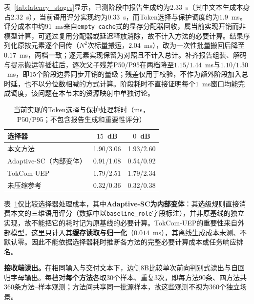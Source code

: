 \documentclass[journal]{IEEEtran}
\begin{document}
表~\ref{tab:latency_stages}显示，已测阶段中报告生成约为$2.33$~s（其中文本生成本身占$2.32$~s），当前语用评分实现约为$0.33$~s，而Token选择与保护调度约为$1.9$~ms。评分成本中约$91$~ms来自\texttt{empty\_cache}式的显存分配器回收，属当前实现开销而非模型计算，可通过复用分配器或延迟释放消除，故不计入方法的必要计算。结果序列化原按元素逐个回传（$N^2$次标量搬运，$2.04$~ms），改为一次性批量搬回后降至$0.17$~ms，两档一致；逐元素实现保留为对照且不计入总计。补齐报告组装、解码与提示搬运等插桩后，逐次父子残差P50/P95在两档降至$1.15/1.44$~ms与$1.10/1.30$~ms，即$15$个阶段边界同步开销的量级；残差仅用于校验，不作为额外阶段加入总时延，也不以分位数相减的方式计算。阶段耗时不直接证明每个$1$~ms窗口均能完成调度，该问题在本节末的资源映射中单独讨论。

\begin{table}[t]
\centering
\caption{当前实现的Token选择与保护处理耗时（ms，P50/P95；不包含报告生成和重要性评分）}
\label{tab:latency_selection}
\renewcommand{\arraystretch}{1.05}
\begin{tabular}{lcc}
\hline
选择器 & $15$~dB & $0$~dB\\
\hline
本文方法 & 1.90/3.06 & 1.93/2.60\\
Adaptive-SC（内部变体） & 0.91/1.08 & 0.54/0.92\\
TokCom-UEP & 1.79/2.51 & 1.79/2.34\\
未压缩参考 & 0.32/0.36 & 0.32/0.38\\
\hline
\end{tabular}
\end{table}

表~\ref{tab:latency_selection}仅比较选择器处理成本，其中\textbf{Adaptive-SC为内部变体}：其选级规则直接消费本文的三维语用评分（数据中以\texttt{baseline\_role}字段标注），并非原基线的独立实现，故不能把它的耗时记为原基线的必要计算。TokCom-UEP的重要性来自外部模型，这里只计入其\textbf{缓存读取与归一化}（$0.014$~ms），其离线生成成本未测、不默认零。因此不能依据选择器耗时推断各方法的完整必要计算成本或任务响应排名。

\textbf{接收端读出。}在相同输入与交付文本下，边侧8B比较单次前向判别式读出与自回归字母输出。每档对\textbf{每个方法}各取$30$个样本、重复$3$次，即每方法$90$条、四方法共$360$条方法--样本观测；方法间共享同一批源样本，故这些观测不视为$360$个独立场景。
\end{document}

